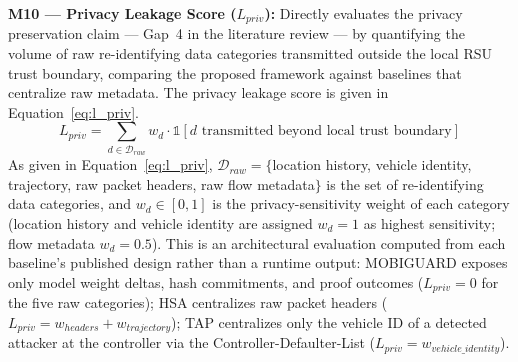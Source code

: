\documentclass[12pt, a4paper]{report}
\begin{document}
{{%

\textbf{M10 — Privacy Leakage Score ($L_{priv}$):}
Directly evaluates the privacy preservation
claim — Gap~4 in the literature review —
by quantifying the volume of raw re-identifying
data categories transmitted outside the local
RSU trust boundary, comparing the proposed
framework against baselines that centralize
raw metadata. The privacy leakage score is
given in Equation~\eqref{eq:l_priv}.
\begin{equation}
L_{priv} =
\sum_{d \in \mathcal{D}_{raw}}
w_d \cdot
\mathbb{1}\!\left[
d \text{ transmitted beyond local trust boundary}
\right]
\label{eq:l_priv}
\end{equation}
As given in Equation~\eqref{eq:l_priv},
$\mathcal{D}_{raw} = \{$location history,
vehicle identity, trajectory, raw packet
headers, raw flow metadata$\}$ is the set
of re-identifying data categories, and
$w_d \in [0,1]$ is the privacy-sensitivity
weight of each category (location history
and vehicle identity are assigned $w_d = 1$
as highest sensitivity; flow metadata
$w_d = 0.5$). This is an architectural
evaluation computed from each baseline's
published design rather than a runtime
output: MOBIGUARD exposes only model weight
deltas, hash commitments, and proof
outcomes ($L_{priv} = 0$ for the five
raw categories); HSA centralizes raw packet headers ($L_{priv} = w_{headers}
+ w_{trajectory}$); TAP centralizes only the
vehicle ID of a detected attacker at the
controller via the Controller-Defaulter-List
($L_{priv} = w_{vehicle\_identity}$).



}}
\end{document}

